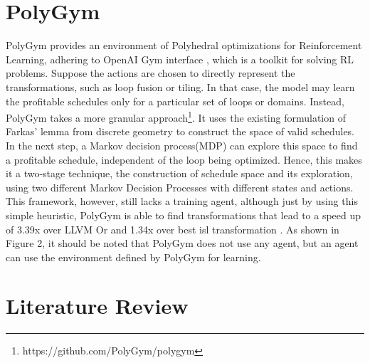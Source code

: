 \documentclass[logo,msc]{infthesis}           %
\begin{document}
\section{PolyGym}

PolyGym provides an environment of Polyhedral optimizations for Reinforcement Learning, adhering to OpenAI Gym interface \cite{Gym}, which is a toolkit for solving RL problems. Suppose the actions are chosen to directly represent the transformations, such as loop fusion or tiling. In that case, the model may learn the profitable schedules only for a particular set of loops or domains. Instead, PolyGym takes a more granular approach\footnote{https://github.com/PolyGym/polygym}. It uses the existing formulation of Farkas' lemma from discrete geometry to construct the space of valid schedules. In the next step, a Markov decision process(MDP) can explore this space to find a profitable schedule, independent of the loop being optimized. Hence, this makes it a two-stage technique, the construction of schedule space and its exploration, using two different Markov Decision Processes with different states and actions. This framework, however, still lacks a training agent, although just by using this simple heuristic, PolyGym is able to find transformations that lead to a speed up of 3.39x over LLVM Or and 1.34x over best isl transformation \cite{9563041}. As shown in Figure 2, it should be noted that PolyGym does not use any agent, but an agent can use the environment defined by PolyGym for learning.

\section{Literature Review}
\end{document}
